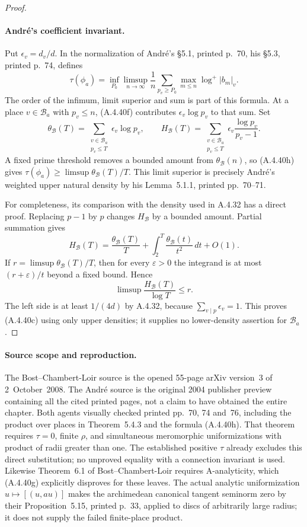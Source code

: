 \begin{proof}
\paragraph{Andr\'e's coefficient invariant.}
Put $\epsilon_v=d_v/d$.  In the normalization of Andr\'e's
\S5.1, printed p.~70, his \S5.3, printed p.~74, defines
\[
 \tau(\phi_a)=\inf_{P_0}\limsup_{n\to\infty}\frac1n
    \sum_{p_v\ge P_0}\max_{m\le n}\log^+|b_m|_v.
 \tag{A.4.40h}
\]
The order of the infimum, limit superior and sum is part of this
formula.\cite{AuditAndre2004Dwork}
At a place $v\in\mathcal B_a$ with $p_v\le n$, (A.4.40f) contributes
$\epsilon_v\log p_v$ to that sum.  Set
\[
 \theta_{\mathcal B}(T)=
     \sum_{\substack{v\in\mathcal B_a\\p_v\le T}}
                        \epsilon_v\log p_v,
 \qquad
 H_{\mathcal B}(T)=
     \sum_{\substack{v\in\mathcal B_a\\p_v\le T}}
                  \epsilon_v\frac{\log p_v}{p_v-1}.
\]
A fixed prime threshold removes a bounded amount from
$\theta_{\mathcal B}(n)$, so (A.4.40h) gives
$\tau(\phi_a)\ge\limsup\theta_{\mathcal B}(T)/T$.
This limit superior is precisely Andr\'e's weighted upper natural
density by his Lemma~5.1.1, printed pp.~70--71.

For completeness, its comparison with the density used in A.4.32
has a direct proof.  Replacing $p-1$ by $p$ changes
$H_{\mathcal B}$ by a bounded amount.  Partial summation gives
\[
 H_{\mathcal B}(T)=\frac{\theta_{\mathcal B}(T)}T
            +\int_2^T\frac{\theta_{\mathcal B}(t)}{t^2}\,dt+O(1).
\]
If $r=\limsup\theta_{\mathcal B}(T)/T$, then for every
$\varepsilon>0$ the integrand is at most
$(r+\varepsilon)/t$ beyond a fixed bound.  Hence
\[
 \limsup\frac{H_{\mathcal B}(T)}{\log T}\le r.
\]
The left side is at least $1/(4d)$ by A.4.32, because
$\sum_{v\mid p}\epsilon_v=1$.  This proves (A.4.40c) using only
upper densities; it supplies no lower-density assertion for
$\mathcal B_a$.
\end{proof}

\paragraph{Source scope and reproduction.}
The Bost--Chambert-Loir source is the opened 55-page arXiv version~3
of 2~October~2008.  The Andr\'e source is the original 2004 publisher
preview containing all the cited printed pages, not a claim to
have obtained the entire chapter.  Both agents visually checked
printed pp.~70, 74 and~76, including the product over places in
Theorem~5.4.3 and the formula (A.4.40h).
That theorem requires $\tau=0$, finite $\rho$, and simultaneous
meromorphic uniformizations with product of radii greater than one.
The established positive $\tau$ already excludes this direct
substitution; no unproved equality with a connection invariant is
used.  Likewise Theorem~6.1 of Bost--Chambert-Loir requires
A-analyticity, which (A.4.40g) explicitly disproves for these leaves.
The actual analytic uniformization
$u\mapsto[(u,au)]$ makes the archimedean canonical tangent seminorm
zero by their Proposition~5.15, printed p.~33, applied to discs of
arbitrarily large radius; it does not supply the failed finite-place
product.


